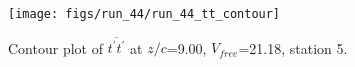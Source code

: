\begin{figure}[H]
\centering
\texttt{[image: figs/run\_44/run\_44\_tt\_contour]}
\caption{Contour plot of $\overline{t^\prime t^\prime}$ at $z/c$=9.00, $V_{free}$=21.18, station 5.}
\label{fig:run_44_tt_contour}
\end{figure}


